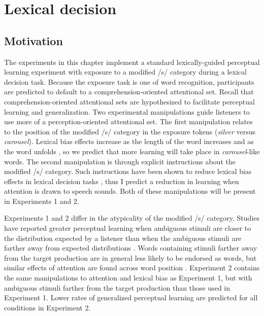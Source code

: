 
\chapter{Lexical decision}
\label{chap:lexdec}

\section{Motivation}

The experiments in this chapter implement a standard lexically-guided perceptual learning experiment with exposure to a modified /s/ category during a lexical decision task.
Because the exposure task is one of word recognition, participants are predicted to default to a comprehension-oriented attentional set.  
Recall that comprehension-oriented attentional sets are hypothesized to facilitate perceptual learning and generalization.
Two experimental manipulations guide listeners to use more of  a perception-oriented attentional set.
The first manipulation relates to the position of the modified /s/ category in the exposure tokens (\emph{silver} versus \emph{carousel}).
Lexical bias effects increase as the length of the word increases and as the word unfolds \citep{Pitt2006, Pitt2012}, so we predict that more learning will take place in \emph{carousel}-like words.
The second manipulation is through explicit instructions about the modified /s/ category.
Such instructions have been shown to reduce lexical bias effects in lexical decision tasks \citep{Pitt2012}, thus I predict a reduction in learning when attention is drawn to speech sounds.
Both of these manipulations will be present in Experiments 1 and 2.

Experiments 1 and 2 differ in the atypicality of the modified /s/ category.
Studies have reported greater perceptual learning when ambiguous stimuli are closer to the distribution expected by a listener than when the ambiguous stimuli are farther away from expected distributions \citep{Sumner2011}.  
Words containing stimuli farther away from the target production are in general less likely to be endorsed as words, but similar effects of attention are found across word position \citep{Pitt2012}.  
Experiment 2 contains the same manipulations to attention and lexical bias as Experiment 1, but with ambiguous stimuli farther from the target production than those used in Experiment 1.
Lower rates of generalized perceptual learning are predicted for all conditions in Experiment 2.

